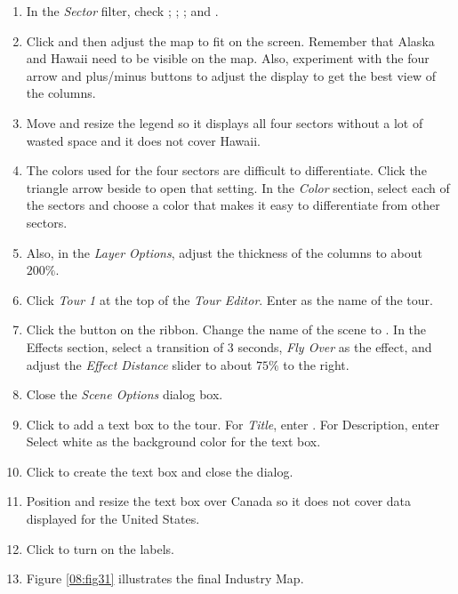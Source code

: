 \begin{enumerate}
	\item In the \textit{Sector} filter, check ; ; ; and .
	\item Click  and then adjust the map to fit on the screen. Remember that Alaska and Hawaii need to be visible on the map. Also, experiment with the four arrow and plus/minus buttons to adjust the display to get the best view of the columns.
	\item Move and resize the legend so it displays all four sectors without a lot of wasted space and it does not cover Hawaii.
	\item The colors used for the four sectors are difficult to differentiate. Click the triangle arrow beside  to open that setting. In the \textit{Color} section, select each of the sectors and choose a color that makes it easy to differentiate from other sectors.
	\item Also, in the \textit{Layer Options}, adjust the thickness of the columns to about $ 200\% $.
	\item Click \textit{Tour 1} at the top of the \textit{Tour Editor}. Enter  as the name of the tour. 
	\item Click the  button on the ribbon. Change the name of the scene to . In the Effects section, select a transition of $ 3 $ seconds, \textit{Fly Over} as the effect, and adjust the \textit{Effect Distance} slider to about $ 75\% $ to the right.
	\item Close the \textit{Scene Options} dialog box.
	\item Click  to add a text box to the tour. For \textit{Title}, enter . For Description, enter  Select white as the background color for the text box.
	\item Click  to create the text box and close the dialog.
	\item Position and resize the text box over Canada so it does not cover data displayed for the United States.
	\item Click  to turn on the labels.
	\item Figure \ref{08:fig31} illustrates the final Industry Map.
	

\end{enumerate}
